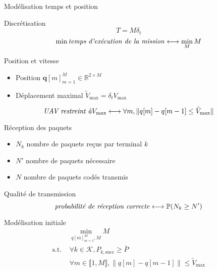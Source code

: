 \begin{frame}{Modélisation temps et position}
  \begin{block}{Discrétisation}
    \[ T = M \delta_t \]
    \begin{equation}
      \min \text{\textit{temps d'exécution de la mission}}
      \longleftrightarrow \min_M M
    \end{equation}
  \end{block}
  \begin{block}{Position et vitesse}
    \begin{itemize}
    \item Position \( \mathbf{q}[m]_{m = 1}^M \in \mathbb{R}^{2 \times
      M} \)
    \item Déplacement maximal \( \tilde{V}_{\text{max}} = \delta_t
      V_{\text{max}} \)
    \end{itemize}
    \begin{equation}
      \text{\textit{UAV restreint à}} V_{\text{max}} \longleftrightarrow
      \forall m, \| q[m] - q[m - 1] \leq \tilde{V}_{\text{max}} \|
    \end{equation}
  \end{block}
\end{frame}
\begin{frame}{Réception des paquets}
  \begin{itemize}
  \item \( N_k \) nombre de paquets reçus par terminal \( k \)
  \item \( N' \) nombre de paquets nécessaire
  \item \( N \) nombre de paquets codés transmis
  \end{itemize}
  \begin{block}{Qualité de transmission}
    \begin{equation}
      \text{\textit{probabilité de réception correcte}} \longleftrightarrow
      \mathbb{P}(N_k \geq N')
    \end{equation}
  \end{block}
\end{frame}
\begin{frame}{Modélisation initiale}
  \begin{equation}\tag{P1}
    \begin{aligned}
      & \min_{q[m]_{m=1}^M, M} M \\
      \text{s.t. } & \forall k \in \mathcal{K}, P_{k, \text{succ}}
      \geq \bar{P} \\
      & \forall m \in \llbracket 1, M \rrbracket, \| q[m] - q[m - 1]
      \| \leq \tilde{V}_{\text{max}}
    \end{aligned}
  \end{equation}
\end{frame}

